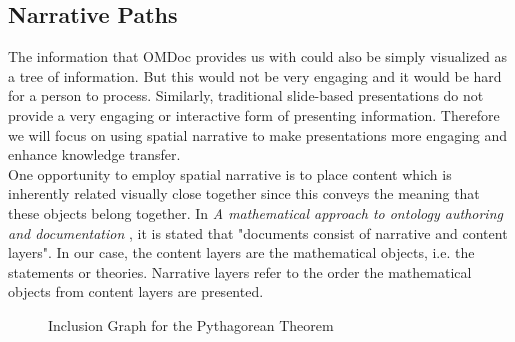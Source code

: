 \documentclass[twoside, 12pt]{article}
\begin{document}
\subsection{Narrative Paths}
\label{sec:narrativePaths}

The information that OMDoc provides us with could also be simply visualized as a tree of information. But this would not be very engaging and it would be hard for a person to process. Similarly, traditional slide-based presentations do not provide a very engaging or interactive form of presenting information. Therefore we will focus on using spatial narrative to make presentations more engaging and enhance knowledge transfer.\\ 

One opportunity to employ spatial narrative is to place content which is inherently related visually close together since this conveys the meaning that these objects belong together. In \textit{A mathematical approach to ontology authoring and documentation} \cite{LK:MathOntoAuthDoc09}, it is stated that "documents consist of narrative and content layers". In our case, the content layers are the mathematical objects, i.e. the statements or theories. Narrative layers refer to the order the mathematical objects from content layers are presented.\\

\begin{figure}
\vspace{-26pt}
  \begin{center}
\vspace{-16pt}
  \caption{Inclusion Graph for the Pythagorean Theorem}
  \label{fig:inclusionGraph}
\vspace{12pt}
  \end{center}
\end{figure}

\begin{figure}
\vspace{-80pt}
\end{figure}
\end{document}
